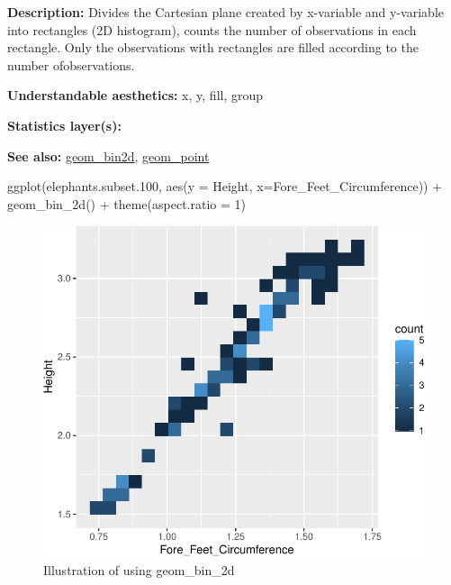 \documentclass[
]{book}
\newenvironment{Shaded}{\begin{snugshade}}{\end{snugshade}}
\newcommand{\AttributeTok}[1]{\textcolor[rgb]{0.77,0.63,0.00}{#1}}
\newcommand{\DecValTok}[1]{\textcolor[rgb]{0.00,0.00,0.81}{#1}}
\newcommand{\FloatTok}[1]{\textcolor[rgb]{0.00,0.00,0.81}{#1}}
\newcommand{\FunctionTok}[1]{\textcolor[rgb]{0.00,0.00,0.00}{#1}}
\newcommand{\NormalTok}[1]{#1}
\newcommand{\SpecialCharTok}[1]{\textcolor[rgb]{0.00,0.00,0.00}{#1}}
\begin{document}
\textbf{Description: } Divides the Cartesian plane created by x-variable and y-variable into rectangles (2D histogram), counts the number of observations in each rectangle. Only the observations with rectangles are filled according to the number ofobservations.

\textbf{Understandable aesthetics: } x, y, fill, group

\textbf{Statistics layer(s): }

\textbf{See also: } \protect\hyperlink{bin2d}{geom\_bin2d}, \protect\hyperlink{point}{geom\_point}

\begin{Shaded}
\begin{Highlighting}[]
\FunctionTok{ggplot}\NormalTok{(elephants.subset}\FloatTok{.100}\NormalTok{, }\FunctionTok{aes}\NormalTok{(}\AttributeTok{y =}\NormalTok{ Height, }\AttributeTok{x=}\NormalTok{Fore\_Feet\_Circumference)) }\SpecialCharTok{+}
  \FunctionTok{geom\_bin\_2d}\NormalTok{() }\SpecialCharTok{+} 
  \FunctionTok{theme}\NormalTok{(}\AttributeTok{aspect.ratio =} \DecValTok{1}\NormalTok{)}
\end{Highlighting}
\end{Shaded}

\begin{figure}
\centering
\includegraphics{Data-Visualisation-geom-Encyclopedia_files/figure-latex/unnamed-chunk-24-1.pdf}
\caption{\label{fig:unnamed-chunk-24}Illustration of using geom\_bin\_2d}
\end{figure}
\end{document}
